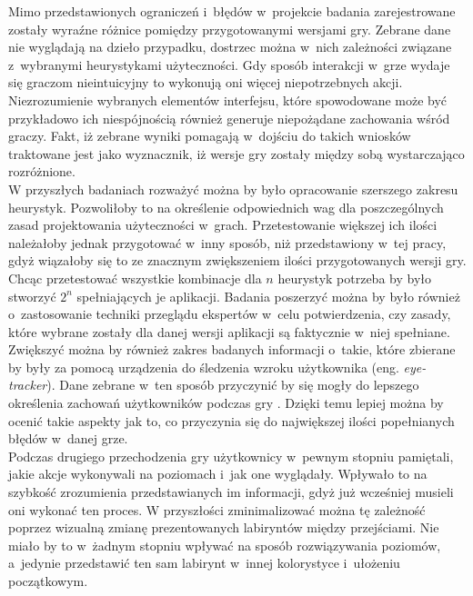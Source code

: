 \documentclass[a4paper,12pt,numbers=noenddot]{report}
\begin{document}
Mimo przedstawionych ograniczeń i~błędów w~projekcie badania zarejestrowane zostały wyraźne różnice pomiędzy przygotowanymi wersjami gry. Zebrane dane nie wyglądają na dzieło przypadku, dostrzec można w~nich zależności związane z~wybranymi heurystykami użyteczności. Gdy sposób interakcji w~grze wydaje się graczom nieintuicyjny to wykonują oni więcej niepotrzebnych akcji. Niezrozumienie wybranych elementów interfejsu, które spowodowane może być przykładowo ich niespójnością również generuje niepożądane zachowania wśród graczy. Fakt, iż zebrane wyniki pomagają w~dojściu do takich wniosków traktowane jest jako wyznacznik, iż wersje gry zostały między sobą wystarczająco rozróżnione. \\


W przyszłych badaniach rozważyć można by było opracowanie szerszego zakresu heurystyk. Pozwoliłoby to na określenie odpowiednich wag dla poszczególnych zasad projektowania użyteczności w~grach. Przetestowanie większej ich ilości należałoby jednak przygotować w~inny sposób, niż przedstawiony w~tej pracy, gdyż wiązałoby się to ze znacznym zwiększeniem ilości przygotowanych wersji gry. Chcąc przetestować wszystkie kombinacje dla $n$ heurystyk potrzeba by było stworzyć $2^{n}$ spełniających je aplikacji. Badania poszerzyć można by było również o~zastosowanie techniki przeglądu ekspertów w~celu potwierdzenia, czy zasady, które wybrane zostały dla danej wersji aplikacji są faktycznie w~niej spełniane.\\
Zwiększyć można by również zakres badanych informacji o~takie, które zbierane by były za pomocą urządzenia do śledzenia wzroku użytkownika (eng. \textit{eye-tracker}). Dane zebrane w~ten sposób przyczynić by się mogły do lepszego określenia zachowań użytkowników podczas gry \cite{online_Eyetracking}. Dzięki temu lepiej można by ocenić takie aspekty jak to, co przyczynia się do największej ilości popełnianych błędów w~danej grze.\\
Podczas drugiego przechodzenia gry użytkownicy w~pewnym stopniu pamiętali, jakie akcje wykonywali na poziomach i~jak one wyglądały. Wpływało to na szybkość zrozumienia przedstawianych im informacji, gdyż już wcześniej musieli oni wykonać ten proces. W przyszłości zminimalizować można tę zależność poprzez wizualną zmianę prezentowanych labiryntów między przejściami. Nie miało by to w~żadnym stopniu wpływać na sposób rozwiązywania poziomów, a~jedynie przedstawić ten sam labirynt w~innej kolorystyce i~ułożeniu początkowym.\\
\end{document}
